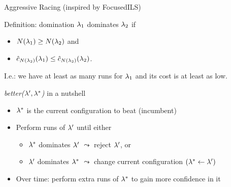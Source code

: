 \begin{frame}[c,fragile]{Aggressive Racing (inspired by FocusedILS) }


\begin{block}{Definition: domination}
\alert{$\mathbf{\lambda}_1$ dominates $\mathbf{\lambda}_2$} if 
\begin{itemize}
\item $N(\mathbf{\lambda}_1) \ge N(\mathbf{\lambda}_2)$ and 
\item $\hat{c}_{N(\mathbf{\lambda}_2)}(\mathbf{\lambda}_1) \le \hat{c}_{N(\mathbf{\lambda}_2)}(\mathbf{\lambda}_2)$.
\end{itemize}
I.e.: we have at least as many runs for $\mathbf{\lambda}_1$ and its cost is at least as low.
\end{block}

\pause

\begin{block}{\textit{better($\mathbf{\lambda}', \mathbf{\lambda}^*$)} in a nutshell}
\begin{itemize}
\item $\mathbf{\lambda}^*$ is the current configuration to beat (incumbent)
\pause
\item Perform runs of $\mathbf{\lambda}'$ until either
\begin{itemize}
\item $\mathbf{\lambda}^*$ dominates $\mathbf{\lambda}'$ $\leadsto$ reject $\mathbf{\lambda}'$, or
\item $\mathbf{\lambda}'$ dominates $\mathbf{\lambda}^*$ $\leadsto$ change current configuration $(\mathbf{\lambda}^* \leftarrow \mathbf{\lambda}')$
\end{itemize}
\pause	
\item Over time: perform extra runs of $\mathbf{\lambda}^*$ to gain more confidence in it
\end{itemize}
\end{block}

\end{frame}



